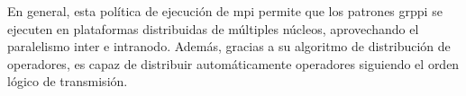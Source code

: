 En general, esta política de ejecución de \acrshort{mpi} permite que los patrones \acrshort{grppi} se ejecuten en plataformas distribuidas de múltiples núcleos, aprovechando el paralelismo inter e intranodo. Además, gracias a su algoritmo de distribución de operadores, es capaz de distribuir automáticamente operadores siguiendo el orden lógico de transmisión.



